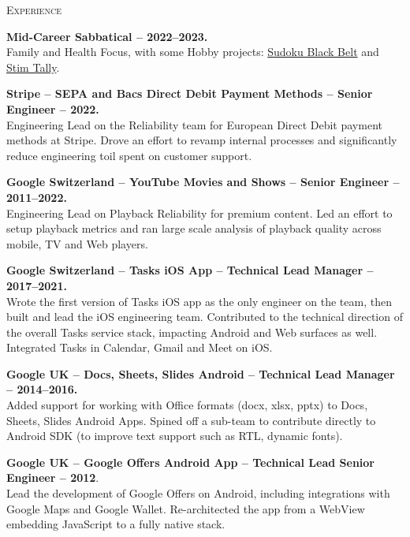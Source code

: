 \documentclass[11pt]{article}
\begin{document}
\vspace{0.12in}
\noindent
\textcolor{Primary}{{\large \textsc{Experience}}}
\begin{list}{}{\leftmargin=0em}

\item
{\bf Mid-Career Sabbatical -- 2022--2023.}\\
Family and Health Focus, with some Hobby projects: \href{https://apps.apple.com/us/app/sudoku-black-belt/id1639802667}{Sudoku Black Belt} and 
\href{https://apps.apple.com/us/app/stim-tally/id6444342899}{Stim Tally}.

\item
{\bf Stripe -- SEPA and Bacs Direct Debit Payment Methods -- Senior Engineer -- 2022.}\\
Engineering Lead on the Reliability team for European Direct Debit payment methods at Stripe.
Drove an effort to revamp internal processes and significantly reduce engineering toil spent on customer support.
  
\item
{\bf Google Switzerland -- YouTube Movies and Shows -- Senior Engineer -- 2011--2022.}\\
Engineering Lead on Playback Reliability for premium content. Led an effort to setup playback metrics and ran large scale analysis of playback quality across mobile, TV and Web players.

\item
{\bf Google Switzerland -- Tasks iOS App -- Technical Lead Manager -- 2017--2021.}\\
Wrote the first version of Tasks iOS app as the only engineer on the team, then built and lead the iOS engineering team.
Contributed to the technical direction of the overall Tasks service stack, impacting Android and Web surfaces
as well. Integrated Tasks in Calendar, Gmail and Meet on iOS.
  
\item
{\bf Google UK -- Docs, Sheets, Slides Android -- Technical Lead Manager -- 2014--2016.}\\
Added support for working with Office formats (docx, xlsx, pptx) to Docs, Sheets, Slides Android Apps. Spined off a
sub-team to contribute directly to Android SDK (to improve text support such as RTL, dynamic fonts). 

\item
{\bf Google UK -- Google Offers Android App -- Technical Lead Senior Engineer -- 2012}.\\
Lead the development of Google Offers on Android, including integrations with Google Maps and Google Wallet.
Re-architected the app from a WebView embedding JavaScript to a fully native stack.


\end{list}
\end{document}
